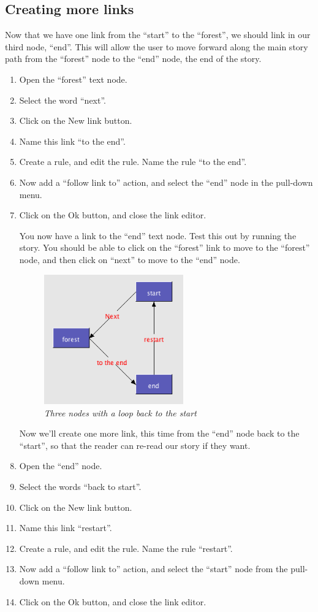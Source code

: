 \documentclass{article}
\begin{document}
\subsection{Creating more links}

Now that we have one link from the ``start'' to the ``forest'', we should link
in our third node, ``end''. This will allow the user to move forward along the
main story path from the ``forest'' node to the ``end'' node, the end of the story.

\begin{enumerate}
\item Open the ``forest'' text node.
\item Select the word ``next''.
\item Click on the New link button.
\item Name this link ``to the end''.
\item Create a rule, and edit the rule. Name the rule ``to the end''.
\item Now add a ``follow link to'' action, and select the ``end'' node in the
pull-down menu.
\item Click on the Ok button, and close the link editor.

You now have a link to the ``end'' text node. Test this out by running
the story. You should be able to click on the ``forest'' link to move to the
``forest'' node, and then click on ``next'' to move to the ``end'' node.
 
\begin{figure}[ht]
  \centering
  \includegraphics[width=6cm]{images/hypedyn-tutorial-1-figure-11}
  \caption{\textit{Three nodes with a loop back to the start}}
  \label{fig:three_nodes_and_links}
\end{figure} 

Now we'll create one more link, this time from the ``end'' node back to the
``start'', so that the reader can re-read our story if they want.

\item Open the ``end'' node.
\item Select the words ``back to start''.
\item Click on the New link button.
\item Name this link ``restart''.
\item Create a rule, and edit the rule. Name the rule ``restart''.
\item Now add a ``follow link to'' action, and select the ``start'' node from
the pull-down menu.
\item Click on the Ok button, and close the link editor.
\end{enumerate}
\end{document}
